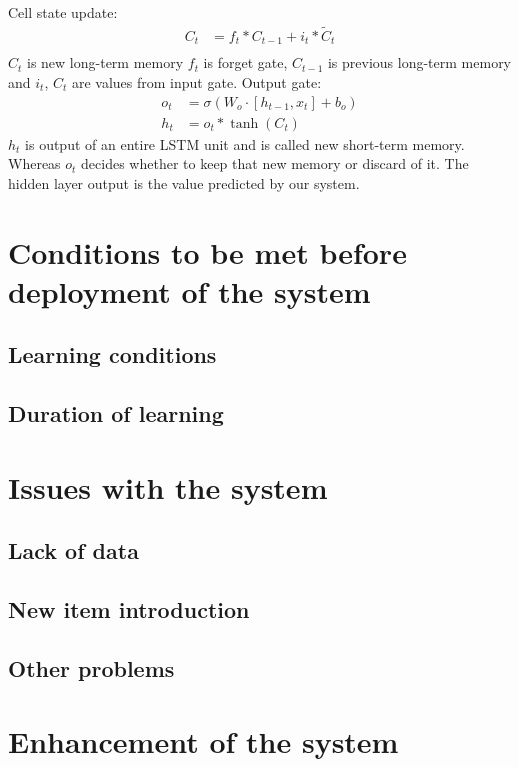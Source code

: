 \documentclass[10pt,twoside,english,a4paper]{article}
\begin{document}
\newline Cell state update:
\begin{align*}
    C_t &= f_t * C_{t-1} + i_t * \tilde{C}_t \\
\end{align*}
$C_t$ is new long-term memory $f_t$ is forget gate, $C_{t-1}$ is previous long-term memory and $i_t$, $C_t$ are values from input gate.
\newline Output gate:
\begin{align*}
    o_t &= \sigma(W_o \cdot [h_{t-1}, x_t] + b_o) \\
    h_t &= o_t * \tanh(C_t)
\end{align*}
$h_t$ is output of an entire LSTM unit and is called new short-term memory. Whereas $o_t$ decides whether to keep that new memory or discard of it.
The hidden layer output is the value predicted by our system.
\section{Conditions to be met before deployment of the system}

\subsection{Learning conditions}

\subsection{Duration of learning}

\section{Issues with the system}

\subsection{Lack of data}

\subsection{New item introduction}

\subsection{Other problems}
 
\section{Enhancement of the system}
\end{document}

